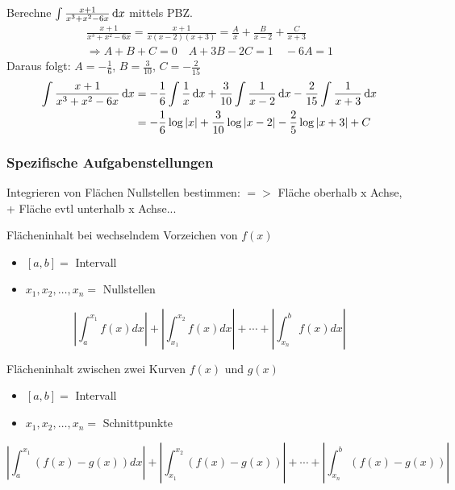 \begin{example}
	Berechne $\int \frac{x+1}{x^3 + x^2 - 6x} \dif x$ mittels PBZ.
	\begin{gather*}
		\frac{x+1}{x^3 + x^2 - 6x} = \frac{x+1}{x(x-2)(x+3)} = \frac{A}{x} + \frac{B}{x-2} + \frac{C}{x+3}\\
		\Rightarrow A + B + C = 0 \quad A + 3B - 2C = 1 \quad -6A = 1
	\end{gather*}
	Daraus folgt: $A = -\frac{1}{6}$, $B = \frac{3}{10}$, $C = -\frac{2}{15}$
	\begin{align*}
		\int \frac{x+1}{x^3 + x^2 - 6x} \dif x &= -\frac{1}{6} \int \frac{1}{x} \dif x + \frac{3}{10} \int \frac{1}{x-2} \dif x - \frac{2}{15} \int \frac{1}{x+3} \dif x\\
						       &= -\frac{1}{6} \log |x| + \frac{3}{10} \log |x-2| - \frac{2}{5} \log |x+3| + C 
	\end{align*}
\end{example}






\subsubsection*{Spezifische Aufgabenstellungen}

\begin{KR}{Integrieren von Flächen}
    Nullstellen bestimmen: $=>$ Fläche oberhalb $\mathrm{x}$ Achse, + Fläche evtl unterhalb x Achse...
    \end{KR}

\begin{KR}{Flächeninhalt bei wechselndem Vorzeichen von $f(x)$}\\
	\begin{itemize}
	  \item $[a, b]=$ Intervall
	  \item $x_{1}, x_{2}, \ldots, x_{n}=$ Nullstellen
	\end{itemize}
	
	$$\left|\int_{a}^{x_{1}} f(x) d x\right|+\left|\int_{x_{1}}^{x_{2}} f(x) d x\right|+\cdots+\left|\int_{x_{n}}^{b} f(x) d x\right|$$
	\end{KR}

	\begin{KR}{Flächeninhalt zwischen zwei Kurven $f(x)$ und $g(x)$}\\
		\begin{itemize}
		  \item $[a, b]=$ Intervall
		  \item $x_{1}, x_{2}, \ldots, x_{n}=$ Schnittpunkte
		\end{itemize}
		$$\left|\int_{a}^{x_{1}}(f(x)-g(x)) d x\right|+\left|\int_{x_{1}}^{x_{2}}(f(x)-g(x))\right|+\cdots+\left|\int_{x_{n}}^{b}(f(x)-g(x))\right|$$
		\end{KR}


